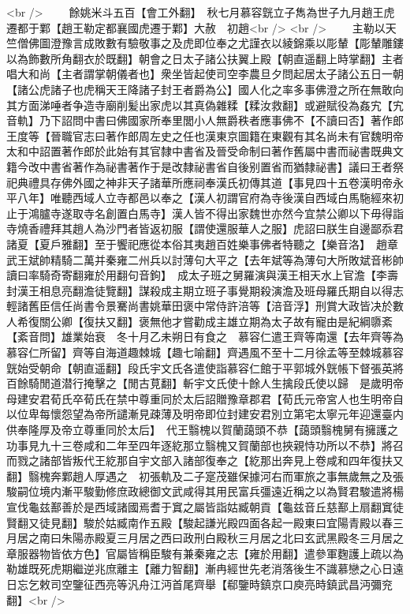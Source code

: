 <br />
　　餘姚米斗五百【會工外翻】　秋七月慕容皝立子雋為世子九月趙王虎遷都于鄴【趙王勒定都襄國虎遷于鄴】大赦　初趙<br />
<br />
　　主勒以天竺僧佛圖澄豫言成敗數有驗敬事之及虎即位奉之尤謹衣以綾錦乘以彫輦【彫輦雕鏤以為飾數所角翻衣於既翻】朝會之日太子諸公扶翼上殿【朝直遥翻上時掌翻】主者唱大和尚【主者謂掌朝儀者也】衆坐皆起使司空李農旦夕問起居太子諸公五日一朝【諸公虎諸子也虎稱天王降諸子封王者爵為公】國人化之率多事佛澄之所在無敢向其方面涕唾者争造寺廟削髪出家虎以其真偽雜糅【糅汝救翻】或避賦役為姦宄【宄音軌】乃下詔問中書曰佛國家所奉里閭小人無爵秩者應事佛不【不讀曰否】著作郎王度等【晉職官志曰著作郎周左史之任也漢東京圖籍在東觀有其名尚未有官魏明帝太和中詔置著作郎於此始有其官隸中書省及晉受命制曰著作舊屬中書而祕書既典文籍今改中書省著作為祕書著作于是改隸祕書省自後别置省而猶隸祕書】議曰王者祭祀典禮具存佛外國之神非天子諸華所應祠奉漢氏初傳其道【事見四十五卷漢明帝永平八年】唯聽西域人立寺都邑以奉之【漢人初謂官府為寺後漢自西域白馬駞經來初止于鴻臚寺遂取寺名創置白馬寺】漢人皆不得出家魏世亦然今宜禁公卿以下毋得詣寺燒香禮拜其趙人為沙門者皆返初服【謂使還服華人之服】虎詔曰朕生自邊鄙忝君諸夏【夏戶雅翻】至于饗祀應從本俗其夷趙百姓樂事佛者特聽之【樂音洛】　趙章武王斌帥精騎二萬并秦雍二州兵以討薄句大平之【去年斌等為薄句大所敗斌音彬帥讀曰率騎奇寄翻雍於用翻句音鉤】　成太子班之舅羅演與漢王相天水上官澹【李壽封漢王相息亮翻澹徒覽翻】謀殺成主期立班子事覺期殺演澹及班母羅氏期自以得志輕諸舊臣信任尚書令景騫尚書姚華田褒中常侍許涪等【涪音浮】刑賞大政皆决於數人希復關公卿【復扶又翻】褒無他才嘗勸成主雄立期為太子故有寵由是紀綱隳紊【紊音問】雄業始衰　冬十月乙未朔日有食之　慕容仁遣王齊等南還【去年齊等為慕容仁所留】齊等自海道趣棘城【趣七喻翻】齊遇風不至十二月徐孟等至棘城慕容皝始受朝命【朝直遥翻】段氏宇文氏各遣使詣慕容仁館于平郭城外皝帳下督張英將百餘騎閒道潜行掩擊之【閒古莧翻】斬宇文氏使十餘人生擒段氏使以歸　是歲明帝母建安君荀氏卒荀氏在禁中尊重同於太后詔贈豫章郡君【荀氏元帝宮人也生明帝自以位卑每懷怨望為帝所譴漸見疎薄及明帝即位封建安君別立第宅太寧元年迎還臺内供奉隆厚及帝立尊重同於太后】　代王翳槐以賀蘭藹頭不恭【藹頭翳槐舅有擁護之功事見九十三卷咸和二年至四年逐紇那立翳槐又賀蘭部也挾親恃功所以不恭】將召而戮之諸部皆叛代王紇那自宇文部入諸部復奉之【紇那出奔見上卷咸和四年復扶又翻】翳槐奔鄴趙人厚遇之　初張軌及二子寔茂雖保據河右而軍旅之事無歲無之及張駿嗣位境内漸平駿勤修庶政總御文武咸得其用民富兵彊遠近稱之以為賢君駿遣將楊宣伐龜兹鄯善於是西域諸國焉耆于窴之屬皆詣姑臧朝貢【龜兹音丘慈鄯上扇翻窴徒賢翻又徒見翻】駿於姑臧南作五殿【駿起謙光殿四面各起一殿東曰宜陽青殿以春三月居之南曰朱陽赤殿夏三月居之西曰政刑白殿秋三月居之北曰玄武黑殿冬三月居之章服器物皆依方色】官屬皆稱臣駿有兼秦雍之志【雍於用翻】遣參軍麴護上疏以為勒雄既死虎期繼逆兆庶離主【離力智翻】漸冉經世先老消落後生不識慕戀之心日遠日忘乞敕司空鑒征西亮等汎舟江沔首尾齊舉【郗鑒時鎮京口庾亮時鎮武昌沔彌兖翻】<br />
